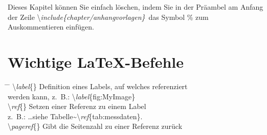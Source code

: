 \setcounter{chapter}{6}
\setcounter{section}{0}
\setcounter{table}{0}
\setcounter{figure}{0}

Dieses Kapitel können Sie einfach löschen, indem Sie in der Präambel am Anfang der Zeile \glqq \textbackslash\textit{include\{chapter/anhang\lowrule vorlagen\}}\grqq~das Symbol \% zum Auskommentieren einfügen.

\section{Wichtige \LaTeX -Befehle}

\begin{tabbing}
\hspace*{0cm} \= \hspace{0.42\linewidth} \= \+\kill
\textbackslash \textit{label}\{\}	\> Definition eines Labels, auf welches referenziert \\ 
	\> werden kann, z.~B.: \textbackslash \textit{label}\{fig:MyImage\}\\ 
\textbackslash \textit{ref}\{\}	\> Setzen einer Referenz zu einem Label\\
\> z.~B.: \ldots siehe Tabelle\~{}\textbackslash \textit{ref}\{tab:messdaten\}.\\ 
\textbackslash \textit{pageref}\{\}	\> Gibt die Seitenzahl zu einer Referenz zurück\\


\end{tabbing}
